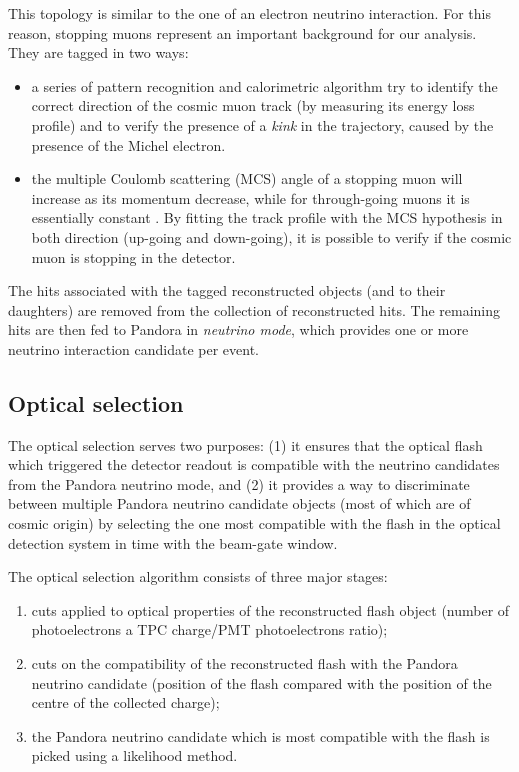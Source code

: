 \begin{description}
This topology is similar to the one of an electron neutrino interaction. For this reason, stopping muons represent an important background for our analysis. 
They are tagged in two ways:
\begin{itemize}
    \item a series of pattern recognition and calorimetric algorithm try to identify the correct direction of the cosmic muon track (by measuring its energy loss profile) and to verify the presence of a \emph{kink} in the trajectory, caused by the presence of the Michel electron.
    \item the multiple Coulomb scattering (MCS) angle of a stopping muon will increase as its momentum decrease, while for through-going muons it is essentially constant \cite{Abratenko:2017nki}. By fitting the track profile with the MCS hypothesis in both direction (up-going and down-going), it is possible to verify if the cosmic muon is stopping in the detector. 
\end{itemize}

\end{description}

The hits associated with the tagged reconstructed objects (and to their daughters) are removed from the collection of reconstructed hits. The remaining hits are then fed to Pandora in \emph{neutrino mode}, which provides one or more neutrino interaction candidate per event. 

\subsection{Optical selection}\label{sec:optical_pre_cuts}
The optical selection serves two purposes: (1) it ensures that the optical flash which triggered the detector readout is compatible with the neutrino candidates from the Pandora neutrino mode, and (2) it provides a way to discriminate between multiple Pandora neutrino candidate objects (most of which are of cosmic origin) by selecting the one most compatible with the flash in the optical detection system in time with the beam-gate window.

The optical selection algorithm consists of three major stages:
\begin{enumerate}
\item cuts applied to optical properties of the reconstructed flash object (number of photoelectrons a TPC charge/PMT photoelectrons ratio);
\item cuts on the compatibility of the reconstructed flash with the Pandora neutrino candidate (position of the flash compared with the position of the centre of the collected charge);
\item the Pandora neutrino candidate which is most compatible with the flash is picked using a likelihood method.
\end{enumerate}

